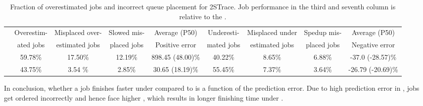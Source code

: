 
\begin{table}
\caption{Fraction of overestimated jobs and incorrect queue placement for 2STrace. Job performance in the third and seventh column is relative to the \oracle. }
  \label{table:sim:misplacedJobs:all}
\vspace{-0.1in}	
  \centering
      {\small
	\begin{tabular}{|c|c|c|c|c|c|c|c|c|} 
	  \hline
		& Overestim- & Misplaced over- & Slowed mis- & Average (P50) & Underesti- & Misplaced under & Spedup mis- & Average (P50)\\
		& ated jobs & estimated jobs & placed jobs & Positive error & mated jobs & estimated jobs & placed jobs & Negative error\\
	  \hline
		\primarybase & 59.78\% & 17.50\% & 12.19\% & 898.45 (48.00)\% & 40.22\% & 8.65\% & 6.88\% & -37.0 (-28.57)\%\\
	  \hline
	  	\slearn & 43.75\% & 3.54 \% & 2.85\% & 30.65 (18.19)\% & 55.45\% & 7.37\% & 3.64\% & -26.79 (-20.69)\% \\
	  \hline
	\end{tabular}
      }
\vspace{-0.1in}	
\end{table}


In conclusion, whether a job finishes faster under \slearn compared to
\primarybase is a function of the prediction error. Due to high prediction
error in \primarybase, jobs get ordered incorrectly and hence face higher
\resistance, which results in longer finishing time under \primarybase.

%

